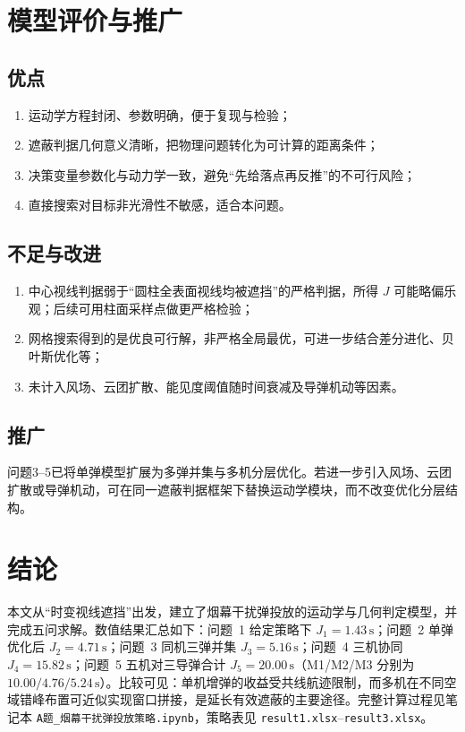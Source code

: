 \documentclass[withoutpreface,bwprint]{cumcmthesis}
\begin{document}
\section{模型评价与推广}

\subsection{优点}
\begin{enumerate}
  \item 运动学方程封闭、参数明确，便于复现与检验；
  \item 遮蔽判据几何意义清晰，把物理问题转化为可计算的距离条件；
  \item 决策变量参数化与动力学一致，避免“先给落点再反推”的不可行风险；
  \item 直接搜索对目标非光滑性不敏感，适合本问题。
\end{enumerate}

\subsection{不足与改进}
\begin{enumerate}
  \item 中心视线判据弱于“圆柱全表面视线均被遮挡”的严格判据，所得 $J$ 可能略偏乐观；后续可用柱面采样点做更严格检验；
  \item 网格搜索得到的是优良可行解，非严格全局最优，可进一步结合差分进化、贝叶斯优化等；
  \item 未计入风场、云团扩散、能见度阈值随时间衰减及导弹机动等因素。
\end{enumerate}

\subsection{推广}
问题3–5已将单弹模型扩展为多弹并集与多机分层优化。若进一步引入风场、云团扩散或导弹机动，可在同一遮蔽判据框架下替换运动学模块，而不改变优化分层结构。

\section{结论}
本文从“时变视线遮挡”出发，建立了烟幕干扰弹投放的运动学与几何判定模型，并完成五问求解。数值结果汇总如下：问题~1 给定策略下 $J_1=1.43\,\mathrm{s}$；问题~2 单弹优化后 $J_2=4.71\,\mathrm{s}$；问题~3 同机三弹并集 $J_3=5.16\,\mathrm{s}$；问题~4 三机协同 $J_4=15.82\,\mathrm{s}$；问题~5 五机对三导弹合计 $J_5=20.00\,\mathrm{s}$（M1/M2/M3 分别为 $10.00/4.76/5.24\,\mathrm{s}$）。比较可见：单机增弹的收益受共线航迹限制，而多机在不同空域错峰布置可近似实现窗口拼接，是延长有效遮蔽的主要途径。完整计算过程见笔记本 \texttt{A题\_烟幕干扰弹投放策略.ipynb}，策略表见 \texttt{result1.xlsx}--\texttt{result3.xlsx}。
\end{document}

